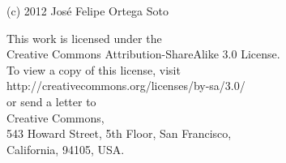 
\thispagestyle{empty}

\vspace*{15cm}

\begin{flushright}
(c) 2012 Jos\'e Felipe Ortega Soto


This work is licensed under the \\
Creative Commons Attribution-ShareAlike 3.0 License.\\
To view a copy of this license, visit\\
http://creativecommons.org/licenses/by-sa/3.0/ \\
or send a letter to  \\
Creative Commons, \\
543 Howard Street, 5th Floor, San Francisco, \\
California, 94105, USA.\\


\end{flushright}
